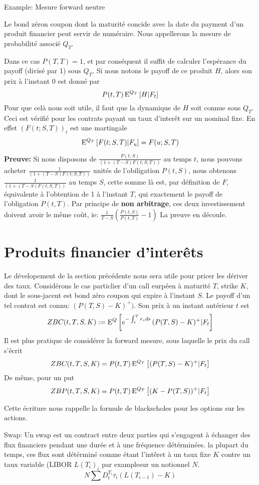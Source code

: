 Example: Mesure forward neutre

Le bond zéron coupon dont la maturité concide avec la date du payment d'un produit financier peut servir de numéraire. Nous appellerons la mesure de probabilité associé $Q_T$.

Dans ce cas $P(T, T) = 1$, et par conséquent il suffit de calculer l'espérance du payoff (divisé par 1) sous $Q_T$.
Si nous notons le payoff de ce produit $H$, alors son prix à l'instant $0$ est donné par $$P(t, T) \, \mathrm{E}^{Q_T} \left[  H | F_t  \right] $$
Pour que celà nous soit utile, il faut que la dynamique de $H$ soit connue sous $Q_T$. Ceci est vérifié pour les contrats payant un taux d'interêt sur un nominal fixe. En effet $(F(t; S, T))_t$ est une martingale 
$$ \mathrm{E}^{Q_T} \left[  F(t; S, T) | F_u  \right] = F(u; S, T)$$

\textbf{Preuve:}
Si nous disposons de  $\frac{P(t, S)}{(1+(T-S)F(t; S, T))}$ au temps $t$, nous pouvons acheter $\frac{1}{(1+(T-S)F(t; S, T))}$ unités de l'obiligation $P(t, S)$, nous obtenons $\frac{1}{(1+(T-S)F(t; S, T))}$ au temps $S$, cette somme là est, par définition de $F$, équivalente à l'obtention de 1 à l'instant $T$, qui exactement le payoff de l'obligation $P(t, T)$.
Par principe de \textbf{non arbitrage}, ces deux investissement doivent avoir le même coût, ie:
$ \frac{1}{T-S} \left( \frac{P(t, S)}{P(t, T)} - 1  \right) $
La preuve en découle.

\newpage

\section{Produits financier d'interêts}

Le dévelopement de la section précédente nous sera utile pour pricer les dériver des taux.
Considérons le cas particlier d'un call eurpéen à maturité $T$, strike $K$, dont le sous-jacent est bond zéro coupon qui expire à l'instant $S$. Le payoff d'un tel contrat est connu: $ (P(T, S) - K)^+)$. Son prix à un instant antérieur $t$ est
$$ZBC(t, T, S, K) := \mathrm{E}^Q \left[  e^{-\int_t^T r_s \rm{d}s} \, (P(T, S) - K)^+ | F_t  \right]$$
Il est plus pratique de considérer la forward mesure, sous laquelle le prix du call s'écrit
$$ZBC(t, T, S, K) = P(t, T) \, \mathrm{E}^{Q_T} \left[ (P(T, S) - K)^+ | F_t \right]$$
De même, pour un put
$$ZBP(t, T, S, K) = P(t, T) \, \mathrm{E}^{Q_T} \left[ (K - P(T, S))^+ | F_t \right]$$

Cette écriture nous rappelle la formule de blackscholes pour les options sur les actions.

\begin{defn}
  Swap:
Un swap est un contract entre deux parties qui s'engagent à échanger des flux financiers pendant une durée et à une fréquence détérminées. la plupart du temps, ces flux sont détérminé comme étant l'intêret à un taux fixe $K$ contre un taux variable (LIBOR ${L(T_i)}_i$ par examplesur un notionnel $N$. 
$$ N \sum D_t^{T_i} \tau_i (L(T_{i-1}) - K) $$
\end{defn}


